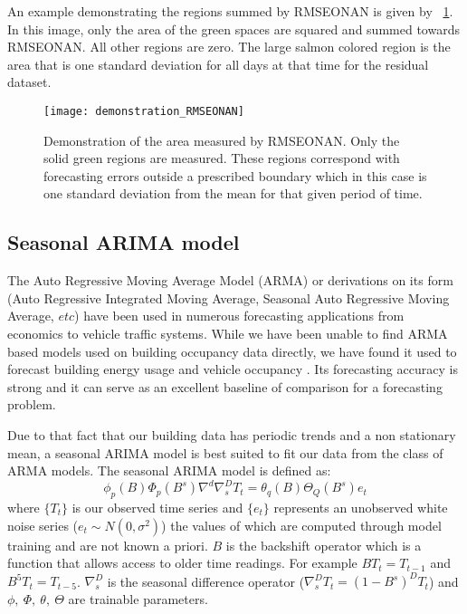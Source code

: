 An example demonstrating the regions summed by RMSEONAN is given by ~\ref{fig:dem_RMSEONAN}.  In this image, only the area of the green spaces are squared and summed towards RMSEONAN.  All other regions are zero.  The large salmon colored region is the area that is one standard deviation for all days at that time for the residual dataset.

\begin{figure}[t]
	\begin{center}
		\texttt{[image: demonstration\_RMSEONAN]}
	\end{center}
	\caption{Demonstration of the area measured by RMSEONAN.  Only the solid green regions are measured.  These regions correspond with forecasting errors outside a prescribed boundary which in this case is one standard deviation from the mean for that given period of time.}
	\label{fig:dem_RMSEONAN}
\end{figure}

\subsection{Seasonal ARIMA model}
The Auto Regressive Moving Average Model (ARMA) or derivations on its form (Auto Regressive Integrated Moving Average, Seasonal Auto Regressive Moving Average, $etc$) have been used in numerous forecasting applications from economics to vehicle traffic systems.  While we have been unable to find ARMA based models used on building occupancy data directly, we have found it used to forecast building energy usage and vehicle occupancy \cite{Williams2003, Hong2011, Newsham2010, Howard2013, Fernandez2011}.  Its forecasting accuracy is strong and it can serve as an excellent baseline of comparison for a forecasting problem.  

Due to that fact that our building data has periodic trends and a non stationary mean, a seasonal ARIMA model is best suited to fit our data from the class of ARMA models.  The seasonal ARIMA model is defined as:
\begin{equation}
\label{eq:sarima}
\phi_{p}(B)\Phi_{p}(B^{s})\nabla^{d}\nabla^{D}_{s}T_{t} = \theta_{q}(B)\Theta_{Q}(B^{s})e_{t}
\end{equation}
\noindent
where $\{T_{t}\}$ is our observed time series and $\{e_t\}$ represents an unobserved white noise series ($e_{t} \sim N(0, \sigma^{2})$) the values of which are computed through model training and are not known a priori.  $B$ is the backshift operator which is a function that allows access to older time readings.  For example $BT_{t} = T_{t-1}$ and $B^{5}T_{t} = T_{t-5}$.  $\nabla^{D}_{s}$ is the seasonal difference operator ($\nabla^{D}_{s}T_{t} = (1 - B^{s})^{D}T_{t}$) and $\phi,\  \Phi,\  \theta,\ \Theta$ are trainable parameters.  

